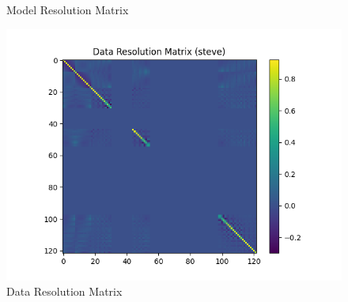 \documentclass{article}
\begin{document}
\begin{itemize}
\begin{figure}[h]
    \caption{Model Resolution Matrix}
\end{figure}
\begin{figure}[h]
    \centering
    \includegraphics[width=1\textwidth]{images/outputs/datares/steve.png}
    \caption{Data Resolution Matrix}
\end{figure}
\clearpage



\end{itemize}
\end{document}
